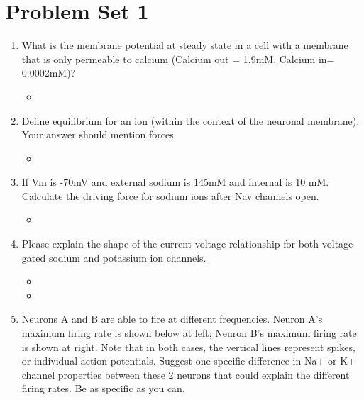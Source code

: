 \documentclass[plain]{inVerba-notes}
\begin{document}
\chapter{Problem Set 1}\label{Problem Set 1}
\begin{enumerate}
    \item What is the membrane potential at steady state in a cell with a membrane that is only permeable to calcium (Calcium out = 1.9mM, Calcium in= 0.0002mM)? 
    
    \begin{itemize}
        \item 
    \end{itemize}

    \item Define equilibrium for an ion (within the context of the neuronal membrane). Your answer should mention forces.
    \begin{itemize}
        \item 
    \end{itemize}

    \item If Vm is -70mV and external sodium is 145mM and internal is 10 mM. Calculate the driving force for sodium ions after Nav channels open.
    \begin{itemize}
        \item 
    \end{itemize}

    \item Please explain the shape of the current voltage relationship for both voltage gated sodium and potassium ion channels.
    
    \bigskip
    
    \begin{itemize}
        \item 
    \end{itemize}
    
    
    \begin{itemize}
        \item 
    \end{itemize}

    \item Neurons A and B are able to fire at different frequencies. Neuron A’s maximum firing rate is shown below at left; Neuron B’s maximum firing rate is shown at right. Note that in both cases, the vertical lines represent spikes, or individual action potentials. Suggest one specific difference in Na+ or K+ channel properties between these 2 neurons that could explain the different firing rates. Be as specific as you can.
    

\end{enumerate}
\end{document}
